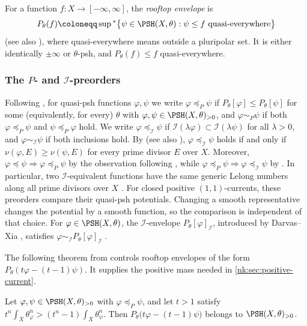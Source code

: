 For a function $f\colon X\to[-\infty,\infty]$, the \emph{rooftop
envelope} is
\[
  P_\theta(f)\coloneqq \sup{}^*\bigl\{\psi\in\PSH(X,\theta):
     \psi\le f\ \text{quasi-everywhere}\bigr\}
\]
\cite[Definition~2.4.1]{SGPT} (see also \cite{RWN14,DDNL18mono}),
where quasi-everywhere means outside a
pluripolar set. It is either identically $\pm\infty$ or $\theta$-psh, and
$P_\theta(f)\le f$ quasi-everywhere.

\subsubsection*{The \texorpdfstring{$P$}{P}- and
\texorpdfstring{$\mathcal I$}{I}-preorders}
Following \cite[Definition~6.1.1]{SGPT}, for quasi-psh functions
$\varphi,\psi$ we write $\varphi\preceq_P\psi$ if
$P_\theta[\varphi]\le P_\theta[\psi]$ for some (equivalently, for every)
$\theta$ with $\varphi,\psi\in\PSH(X,\theta)_{>0}$, and
$\varphi\sim_P\psi$ if both $\varphi\preceq_P\psi$ and $\psi\preceq_P\varphi$
hold. We write $\varphi\preceq_{\mathcal I}\psi$ if
$\mathcal I(\lambda\varphi)\subset\mathcal I(\lambda\psi)$ for all $\lambda>0$, and
$\varphi\sim_{\mathcal I}\psi$ if both inclusions hold. By
\cite[Proposition~6.1.2]{SGPT} (see also \cite{BFJ08}),
$\varphi\preceq_{\mathcal I}\psi$ holds if and only if
$\nu(\varphi,E)\ge\nu(\psi,E)$ for every prime divisor $E$ over
$X$. Moreover,
$\varphi\preceq\psi\Rightarrow\varphi\preceq_P\psi$ by the observation
following \cite[Definition~6.1.1]{SGPT}, while
$\varphi\preceq_P\psi\Rightarrow\varphi\preceq_{\mathcal I}\psi$ by
\cite[Corollary~6.1.1]{SGPT}. In particular, two
$\mathcal I$-equivalent functions have the same generic Lelong numbers along all
prime divisors over $X$ \cite[Proposition~3.2.1]{SGPT}. 
For closed positive $(1,1)$-currents, these preorders compare their quasi-psh potentials. Changing a smooth representative changes the potential by a smooth function, so the comparison is independent of that choice.
For
$\varphi\in\PSH(X,\theta)$, the $\mathcal I$-envelope
$P_\theta[\varphi]_{\mathcal I}$, introduced by Darvas--Xia \cite{DX22},
satisfies $\varphi\sim_{\mathcal I} P_\theta[\varphi]_\mathcal I$
\cite[Proposition~3.2.6]{SGPT}.

The following theorem from \cite[Theorem~6.1.1]{SGPT} controls rooftop
envelopes of the form $P_\theta(t\varphi-(t-1)\psi)$. It supplies the
positive mass needed in \cref{nk:sec:positive-current}.

\begin{theorem}\label{nk:thm:rooftop}
Let $\varphi,\psi\in\PSH(X,\theta)_{>0}$ with $\varphi\preceq_P\psi$, and
let $t>1$ satisfy
$t^n\int_X\theta_\varphi^n>(t^n-1)\int_X\theta_\psi^n$. Then
$P_\theta\bigl(t\varphi-(t-1)\psi\bigr)$ belongs to
$\PSH(X,\theta)_{>0}$.
\end{theorem}

